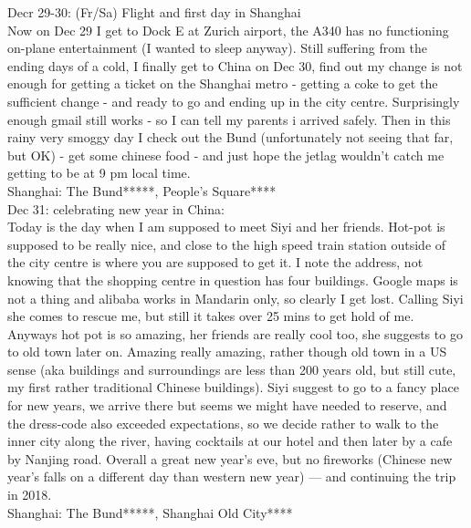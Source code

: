 Decr 29-30: (Fr/Sa) Flight and first day in Shanghai\\
Now on Dec 29 I get to Dock E at Zurich airport, the A340 has no functioning on-plane entertainment (I wanted to sleep anyway). Still suffering from the ending days of a cold, I finally get to China on Dec 30, find out my change is not enough for getting a ticket on the Shanghai metro - getting a coke to get the sufficient change - and ready to go and ending up in the city centre. Surprisingly enough gmail still works - so I can tell my parents i arrived safely. Then in this rainy very smoggy day I check out the Bund (unfortunately not seeing that far, but OK) - get some chinese food - and just hope the jetlag wouldn't catch me getting to be at 9 pm local time.\\

Shanghai: The Bund*****, People's Square****\\

Dec 31: celebrating new year in China:\\
Today is the day when I am supposed to meet Siyi and her friends. Hot-pot is supposed to be really nice, and close to the high speed train station outside of the city centre is where you are supposed to get it. I note the address, not knowing that the shopping centre in question has four buildings. Google maps is not a thing and alibaba works in Mandarin only, so clearly I get lost. Calling Siyi she comes to rescue me, but still it takes over 25 mins to get hold of me. Anyways hot pot is so amazing, her friends are really cool too, she suggests to go to old town later on. Amazing really amazing, rather though old town in a US sense (aka buildings and surroundings are less than 200 years old, but still cute, my first rather traditional Chinese buildings). Siyi suggest to go to a fancy place for new years, we arrive there but seems we might have needed to reserve, and the dress-code also exceeded expectations, so we decide rather to walk to the inner city along the river, having cocktails at our hotel and then later by a cafe by Nanjing road. Overall a great new year's eve, but no fireworks (Chinese new year's falls on a different day than western new year) --- and continuing the trip in 2018.\\

Shanghai: The Bund*****, Shanghai Old City****\\
